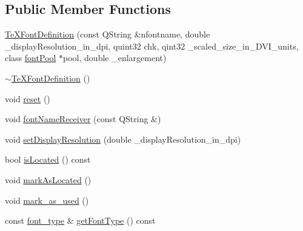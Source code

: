 \subsection*{Public Member Functions}
\begin{DoxyCompactItemize}
\item 
\hyperlink{classTeXFontDefinition_a78eee3f166b4afe9e73394b26c5238ac}{Te\+X\+Font\+Definition} (const Q\+String \&nfontname, double \+\_\+display\+Resolution\+\_\+in\+\_\+dpi, quint32 chk, qint32 \+\_\+scaled\+\_\+size\+\_\+in\+\_\+\+D\+V\+I\+\_\+units, class \hyperlink{classfontPool}{font\+Pool} $\ast$pool, double \+\_\+enlargement)
\item 
\hyperlink{classTeXFontDefinition_a9d75e9c4b5e22f88f9f62bad0aa72594}{$\sim$\+Te\+X\+Font\+Definition} ()
\item 
void \hyperlink{classTeXFontDefinition_af39f7ad8018a8ccf6aded2e81c2700b3}{reset} ()
\item 
void \hyperlink{classTeXFontDefinition_aa62180494b1284ddaef8cf117c52126a}{font\+Name\+Receiver} (const Q\+String \&)
\item 
void \hyperlink{classTeXFontDefinition_a676ff9093ae228647162138963d2c1cc}{set\+Display\+Resolution} (double \+\_\+display\+Resolution\+\_\+in\+\_\+dpi)
\item 
bool \hyperlink{classTeXFontDefinition_aab4a426fd2dd2513c97613cb6406ef41}{is\+Located} () const 
\item 
void \hyperlink{classTeXFontDefinition_a5d1615536b321b4ede9df08326fc3cbd}{mark\+As\+Located} ()
\item 
void \hyperlink{classTeXFontDefinition_af481c09afa81fabb899ae5c005212371}{mark\+\_\+as\+\_\+used} ()
\item 
const \hyperlink{classTeXFontDefinition_a74669917a483ec5a5c8dd8e0335fbd8b}{font\+\_\+type} \& \hyperlink{classTeXFontDefinition_aafdb39a6beae35618238502ad1b25912}{get\+Font\+Type} () const 
\end{DoxyCompactItemize}
